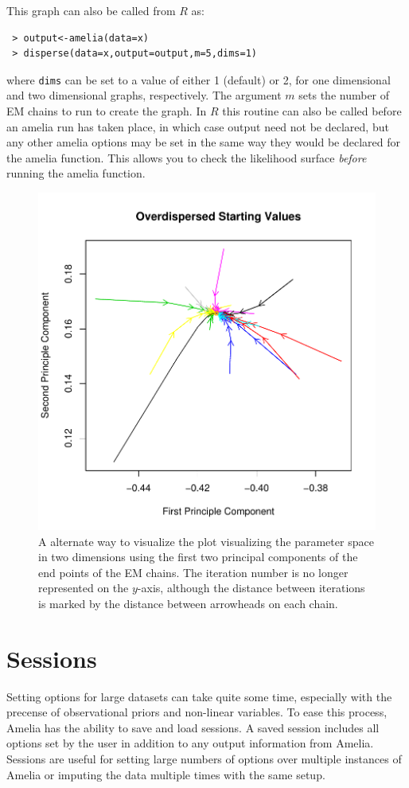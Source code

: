 \documentclass[12pt,titlepage]{article}
\begin{document}
This graph can also be called from $R$ as:
\begin{verbatim}
 > output<-amelia(data=x) 
 > disperse(data=x,output=output,m=5,dims=1)
\end{verbatim}
where \texttt{dims} can be set to a value of either 1 (default) or 2,
for one dimensional and two dimensional graphs, respectively.  The
argument $m$ sets the number of EM chains to run to create the graph.
In $R$ this routine can also be called before an amelia run has taken
place, in which case output need not be declared, but any other amelia
options may be set in the same way they would be declared for the
amelia function.  This allows you to check the likelihood surface
\emph{before} running the amelia function.
\begin{figure}
  \centering \includegraphics[scale=.7]{overdis2d}
  \caption{ A alternate way to visualize the plot visualizing the
    parameter space in two dimensions using the first two principal
    components of the end points of the EM chains.  The iteration
    number is no longer represented on the $y$-axis, although the
    distance between iterations is marked by the distance between
    arrowheads on each chain.}
\end{figure}

\section{Sessions}
\label{sec:sessions}
Setting options for large datasets can take quite some time, especially
with the precense of observational priors and non-linear variables.  To
ease this process, Amelia has the ability to save and load sessions.
A saved session includes all options set by the user in addition to any
output information from Amelia.  Sessions are useful for setting large
numbers of options over multiple instances of Amelia or imputing the data
multiple times with the same setup.   
\end{document}
